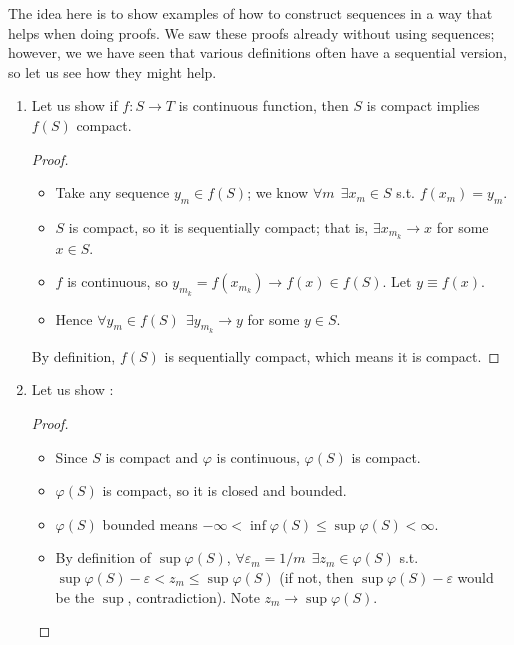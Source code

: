 \documentclass{article}
\begin{document}
The idea here is to show examples of how to construct sequences in a way that helps when doing proofs. We saw these proofs already without using sequences; however, we we have seen that various definitions often have a sequential version, so let us see how they might help.
\begin{enumerate}
  \item Let us show if $f: S \to T$ is continuous function, then $S$ is compact implies $f(S)$ compact.
    \begin{proof}
      \begin{itemize}[label=$\bullet$]
        \item Take any sequence $y_m \in f(S)$; we know $\forall m ~~ \exists x_m \in S$ s.t. $f(x_m) = y_m$.

        \item $S$ is compact, so it is sequentially compact; that is, $\exists x_{m_k} \to x$ for some $x \in S$.

        \item $f$ is continuous, so $y_{m_k} = f(x_{m_k}) \to f(x) \in f(S)$. Let $y \equiv f(x)$.

        \item Hence $\forall y_m \in f(S) ~~ \exists y_{m_k} \to y$ for some $y \in S$.
      \end{itemize}

      By definition, $f(S)$ is sequentially compact, which means it is compact.
    \end{proof}

  \item Let us show :
    \begin{proof}
      \begin{itemize}[label=$\bullet$]
        \item Since $S$ is compact and $\varphi$ is continuous, $\varphi(S)$ is compact.

        \item $\varphi(S)$ is compact, so it is closed and bounded.

        \item $\varphi(S)$ bounded means $-\infty < \inf \varphi(S) \le \sup \varphi(S) < \infty$.

        \item By definition of $\sup \varphi(S)$, $\forall \varepsilon_m = 1/m ~~ \exists z_m \in \varphi(S)$ s.t. $\sup \varphi(S) - \varepsilon < z_m \le \sup \varphi(S)$ (if not, then $\sup \varphi(S) - \varepsilon$ would be the $\sup$, contradiction). Note $z_m \to \sup \varphi(S)$.


\end{itemize}
\end{proof}
\end{enumerate}
\end{document}
